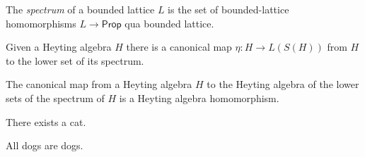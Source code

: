 \begin{definition}
    \label{def:spectrum}
    The \emph{spectrum} of a bounded lattice $L$ is the set of bounded-lattice homomorphisms
    $L \to \mathsf{Prop}$ qua bounded lattice.
\end{definition}

\begin{definition}
    \label{def:joyal-eta}
    Given a Heyting algebra $H$ there is a canonical map $\eta : H \to L(S(H))$ from
    $H$ to the lower set of its spectrum.
\end{definition}

\begin{theorem}
    \label{thm:joyal-representation}
    \leanok
    The canonical map from a Heyting algebra $H$ to the Heyting algebra of the lower sets
    of the spectrum of $H$ is a Heyting algebra homomorphism.
\end{theorem}

\begin{theorem}
    \label{thm:cat-theorem}
    There exists a cat.
\end{theorem}

\begin{theorem}
    \label{thm:dog-theorem}
    \leanok
    All dogs are dogs.
\end{theorem}